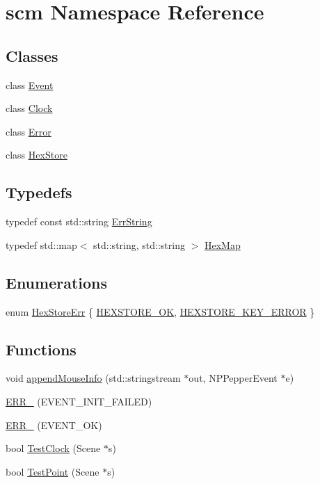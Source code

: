 \hypertarget{namespacescm}{
\section{scm Namespace Reference}
\label{namespacescm}
}
\subsection*{Classes}
\begin{DoxyCompactItemize}
\item 
class \hyperlink{classscm_1_1_event}{Event}
\item 
class \hyperlink{classscm_1_1_clock}{Clock}
\item 
class \hyperlink{classscm_1_1_error}{Error}
\item 
class \hyperlink{classscm_1_1_hex_store}{HexStore}
\end{DoxyCompactItemize}
\subsection*{Typedefs}
\begin{DoxyCompactItemize}
\item 
typedef const std::string \hyperlink{namespacescm_a13a6ecf77ceb7b5b3a38e0fada54aa99}{ErrString}
\item 
typedef std::map$<$ std::string, std::string $>$ \hyperlink{namespacescm_a4d40b517d9d5d1165028e138a05ef06d}{HexMap}
\end{DoxyCompactItemize}
\subsection*{Enumerations}
\begin{DoxyCompactItemize}
\item 
enum \hyperlink{namespacescm_a705760e217d94addc2f8f8102f624d61}{HexStoreErr} \{ \hyperlink{namespacescm_a705760e217d94addc2f8f8102f624d61a646922e14c685ecf838b9a5f8621ef55}{HEXSTORE\_\-OK}, 
\hyperlink{namespacescm_a705760e217d94addc2f8f8102f624d61a723d79af0e48a083e3dd825655a3ddc2}{HEXSTORE\_\-KEY\_\-ERROR}
 \}
\end{DoxyCompactItemize}
\subsection*{Functions}
\begin{DoxyCompactItemize}
\item 
void \hyperlink{namespacescm_acb8f6b2f25d7c07de183bb8b8d518510}{appendMouseInfo} (std::stringstream $\ast$out, NPPepperEvent $\ast$e)
\item 
\hyperlink{namespacescm_adbb7998a18f4d5b55f2d9af9146e27e9}{ERR\_\-} (EVENT\_\-INIT\_\-FAILED)
\item 
\hyperlink{namespacescm_af343ae95ed75977e4da042874b9edacc}{ERR\_\-} (EVENT\_\-OK)
\item 
bool \hyperlink{namespacescm_a2f933647227de09b34772f194e579a63}{TestClock} (Scene $\ast$s)
\item 
bool \hyperlink{namespacescm_aca67b9b84fd6253da0c69b4c521e6bc6}{TestPoint} (Scene $\ast$s)
\end{DoxyCompactItemize}


